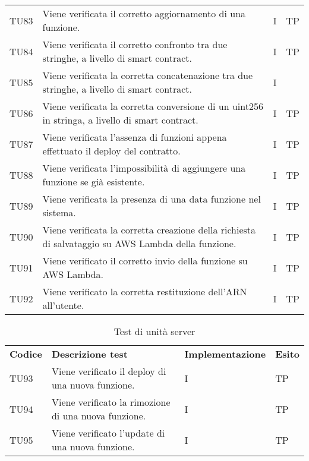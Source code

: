 \begin{longtable}{|C{1.5cm}|C{8cm}|C{3cm}|C{1cm}|}
	TU83 &
	Viene verificata il corretto aggiornamento di una funzione.  &
	I & TP\\

	TU84 &
	Viene verificata il corretto confronto tra due stringhe, a livello di smart contract.  &
	I & TP\\

	TU85 &
	Viene verificata la corretta concatenazione tra due stringhe, a livello di smart contract.  &
	I \\

	TU86 &
	Viene verificata la corretta conversione di un uint256 in stringa, a livello di smart contract.  &
	I & TP\\

	TU87 &
	Viene verificata l'assenza di funzioni appena effettuato il deploy del contratto.  &
	I & TP\\

	TU88 &
	Viene verificata l'impossibilità di aggiungere una funzione se già esistente.  &
	I & TP\\

	TU89 &
	Viene verificata la presenza di una data funzione nel sistema.  &
	I & TP\\

	TU90 &
	Viene verificata la corretta creazione della richiesta di salvataggio su AWS Lambda della funzione.  &
	I & TP\\

	TU91 &
	Viene verificato il corretto invio della funzione su AWS Lambda.  &
	I & TP\\
	
	TU92 &
	Viene verificato la corretta restituzione dell'ARN all'utente.  &
	I & TP\\


\end{longtable}





\renewcommand{\arraystretch}{1.5}
\begin{longtable}{|C{1.5cm}|C{8cm}|C{3cm}|C{1cm}|}
	
	\caption{Test di unità server}\\
	\hline
	
	\textbf{Codice} & \textbf{Descrizione test}  &\textbf{Implementazione}& \textbf{Esito}
	\tabularnewline
	\endfirsthead
	
	TU93 &
	Viene verificato il deploy di una nuova funzione.  &
	I & TP\\
	
	TU94 &
	Viene verificato la rimozione di una nuova funzione.  &
	I & TP\\
	
	TU95 &
	Viene verificato l'update di una nuova funzione.  &
	I & TP\\
	
	
	
\end{longtable}



